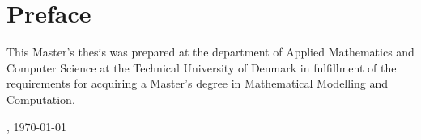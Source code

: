 \chapter{Preface}
This Master's thesis was prepared at the department of Applied Mathematics and Computer Science at the Technical University of Denmark in fulfillment of the requirements for acquiring a Master's degree in Mathematical Modelling and Computation.

\vfill

{
    \centering
    \thesislocation{}, \today\\[1cm]
    \hspace{3cm}
    \begin{flushright}
        \thesisauthor{}
    \end{flushright}
}
